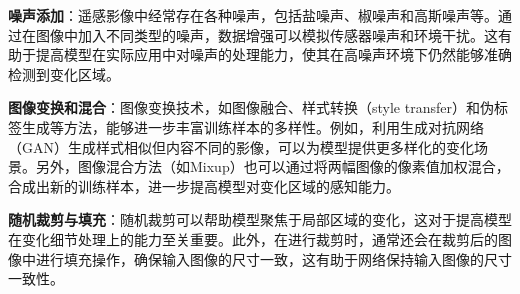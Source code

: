 \textbf{噪声添加}：遥感影像中经常存在各种噪声，包括盐噪声、椒噪声和高斯噪声等。通过在图像中加入不同类型的噪声，数据增强可以模拟传感器噪声和环境干扰。这有助于提高模型在实际应用中对噪声的处理能力，使其在高噪声环境下仍然能够准确检测到变化区域。

\textbf{图像变换和混合}：图像变换技术，如图像融合、样式转换（style transfer）和伪标签生成等方法，能够进一步丰富训练样本的多样性。例如，利用生成对抗网络（GAN）生成样式相似但内容不同的影像，可以为模型提供更多样化的变化场景。另外，图像混合方法（如Mixup）也可以通过将两幅图像的像素值加权混合，合成出新的训练样本，进一步提高模型对变化区域的感知能力。

\textbf{随机裁剪与填充}：随机裁剪可以帮助模型聚焦于局部区域的变化，这对于提高模型在变化细节处理上的能力至关重要。此外，在进行裁剪时，通常还会在裁剪后的图像中进行填充操作，确保输入图像的尺寸一致，这有助于网络保持输入图像的尺寸一致性。



